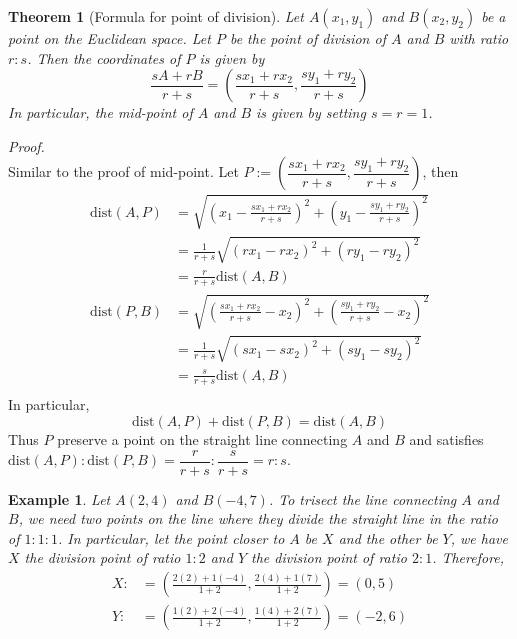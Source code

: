 \documentclass[12pt]{article}
\newtheorem*{theorem}{Theorem}
\newtheorem*{example}{Example}
\renewenvironment{proof}[1][Proof]{\begin{snugshade*} \textit{{#1}.}\\}{\hfill \qedsymbol \end{snugshade*}}
\begin{document}
    \begin{theorem}[Formula for point of division]
        Let $A(x_1,y_1)$ and $B(x_2,y_2)$ be a point on the Euclidean space. Let $P$ be the point of division of $A$ and $B$ with ratio $r:s$. Then the coordinates of $P$ is given by $$\frac{sA+rB}{r+s}=(\frac{sx_1+rx_2}{r+s},\frac{sy_1+ry_2}{r+s})$$ In particular, the mid-point of $A$ and $B$ is given by setting $s=r=1$.
    \end{theorem}

    \begin{proof}
        Similar to the proof of mid-point. Let $P:=(\dfrac{sx_1+rx_2}{r+s},\dfrac{sy_1+ry_2}{r+s})$, then\begin{align*}
            \mathrm{dist}(A,P)&=\sqrt{(x_1-\frac{sx_1+rx_2}{r+s})^2+(y_1-\frac{sy_1+ry_2}{r+s})^2}\\
            &=\frac{1}{r+s}\sqrt{(rx_1-rx_2)^2+(ry_1-ry_2)^2}\\
            &=\frac{r}{r+s}\mathrm{dist}(A,B)\\
            \mathrm{dist}(P,B)&=\sqrt{(\frac{sx_1+rx_2}{r+s}-x_2)^2+(\frac{sy_1+ry_2}{r+s}-x_2)^2}\\
            &=\frac{1}{r+s}\sqrt{(sx_1-sx_2)^2+(sy_1-sy_2)^2}\\
            &=\frac{s}{r+s}\mathrm{dist}(A,B)\\
        \end{align*}
        In particular, $$\mathrm{dist}(A,P)+\mathrm{dist}(P,B)=\mathrm{dist}(A,B)$$
        Thus $P$ preserve a point on the straight line connecting $A$ and $B$ and satisfies $\mathrm{dist}(A,P):\mathrm{dist}(P,B)=\dfrac{r}{r+s}:\dfrac{s}{r+s}=r:s$.
    \end{proof}

    \begin{example}
        Let $A(2,4)$ and $B(-4,7)$. To trisect the line connecting $A$ and $B$, we need two points on the line where they divide the straight line in the ratio of $1:1:1$. In particular, let the point closer to $A$ be $X$ and the other be $Y$, we have $X$ the division point of ratio $1:2$ and $Y$ the division point of ratio $2:1$. Therefore,\begin{align*}
            X:&=(\frac{2(2)+1(-4)}{1+2}, \frac{2(4)+1(7)}{1+2})=(0,5)\\
            Y:&=(\frac{1(2)+2(-4)}{1+2}, \frac{1(4)+2(7)}{1+2})=(-2,6)\\
        \end{align*}
    \end{example}
\end{document}
